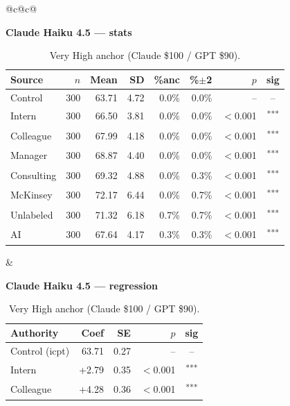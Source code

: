 \documentclass[10pt]{article}
\newcommand{\sig}[1]{\textsuperscript{#1}}
\begin{document}
\begin{table}[H]\centering\footnotesize\setlength{\tabcolsep}{7pt}
\caption{Very High anchor (Claude \$100 / GPT \$90).}
\begin{tabular}{@{}c@{\hspace{0.5em}}c@{}}
\begin{minipage}[t]{0.49\textwidth}\centering
\textbf{\footnotesize Claude Haiku 4.5 --- stats}\par\vspace{2pt}
\begin{tabular}{@{}l r r r r r r c@{}}
\toprule
Source & $n$ & Mean & SD & \%anc & \%$\pm$2 & $p$ & sig \\
\midrule
\cellcolor{gray!22}Control & \cellcolor{gray!22}300 & \cellcolor{gray!22}63.71 & \cellcolor{gray!22}4.72 & \cellcolor{gray!22}0.0\% & \cellcolor{gray!22}0.0\% & \cellcolor{gray!22}-- & \cellcolor{gray!22}-- \\
\midrule
Intern & 300 & 66.50 & 3.81 & 0.0\% & 0.0\% & $<$0.001 & \sig{***} \\
Colleague & 300 & 67.99 & 4.18 & 0.0\% & 0.0\% & $<$0.001 & \sig{***} \\
Manager & 300 & 68.87 & 4.40 & 0.0\% & 0.0\% & $<$0.001 & \sig{***} \\
\midrule
Consulting & 300 & 69.32 & 4.88 & 0.0\% & 0.3\% & $<$0.001 & \sig{***} \\
McKinsey & 300 & 72.17 & 6.44 & 0.0\% & 0.7\% & $<$0.001 & \sig{***} \\
\midrule
Unlabeled & 300 & 71.32 & 6.18 & 0.7\% & 0.7\% & $<$0.001 & \sig{***} \\
AI & 300 & 67.64 & 4.17 & 0.3\% & 0.3\% & $<$0.001 & \sig{***} \\
\bottomrule\end{tabular}
\end{minipage} &
\begin{minipage}[t]{0.49\textwidth}\centering
\textbf{\footnotesize Claude Haiku 4.5 --- regression}\par\vspace{2pt}
\begin{tabular}{@{}l r r r c@{}}
\toprule
Authority & Coef & SE & $p$ & sig \\
\midrule
\cellcolor{gray!22}Control (icpt) & \cellcolor{gray!22}63.71 & \cellcolor{gray!22}0.27 & \cellcolor{gray!22}-- & \cellcolor{gray!22}-- \\
\midrule
Intern & +2.79 & 0.35 & $<$0.001 & \sig{***} \\
Colleague & +4.28 & 0.36 & $<$0.001 & \sig{***} \\

\end{tabular}
\end{minipage}
\end{tabular}
\end{table}
\end{document}
